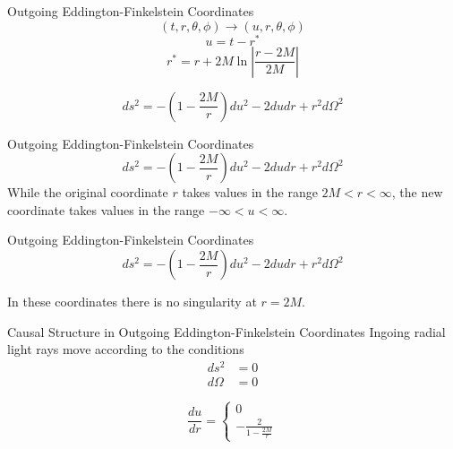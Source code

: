 \documentclass{beamer}
\begin{document}
  \begin{darkframes}        

		\begin{frame}{Outgoing Eddington-Finkelstein Coordinates}
        	$$ (t, r, \theta, \phi) \longrightarrow (u, r, \theta, \phi) $$
            \pause
            $$ u = t - r^* $$
            \pause
        	$$ r^{*} = r + 2M \ln\left| \frac{r-2M}{2M}\right| $$
            \pause
            \bigskip
            
            $$ ds^2 = -\left( 1 - \frac{2M}{r} \right) du^2 
            - 2dudr + r^2 d\Omega^2 $$
    	\end{frame}
        
        \begin{frame}{Outgoing Eddington-Finkelstein Coordinates}
            $$ ds^2 = -\left( 1 - \frac{2M}{r} \right) du^2 
            - 2dudr + r^2 d\Omega^2 $$
            \pause
            \bigskip
            While the original coordinate $r$ takes values in the range $2M < r < \infty$,
the new coordinate takes values in the range $ -\infty < u < \infty$.
    	\end{frame}
        
        \begin{frame}{Outgoing Eddington-Finkelstein Coordinates}
            $$ ds^2 = -\left( 1 - \frac{2M}{r} \right) du^2 
            - 2dudr + r^2 d\Omega^2 $$
            \pause
            \bigskip
            
            \centering
            {In these coordinates there is no singularity at $ r = 2M $.}
    	\end{frame}
        
        \begin{frame}{Causal Structure in Outgoing Eddington-Finkelstein Coordinates}
            Ingoing radial light rays move according to the conditions
            \begin{align*}
            	ds^2 &= 0\\ 
            	d\Omega &= 0
            \end{align*}
            \pause
            \bigskip
            
            $$ \frac{du}{dr} = \left\lbrace 
            		\begin{array}{c} 0\\
						- \frac{2}{1 - \frac{2M}{r}}
					\end{array} \right. $$
    	\end{frame}  
  \end{darkframes}    
  
\end{document}
